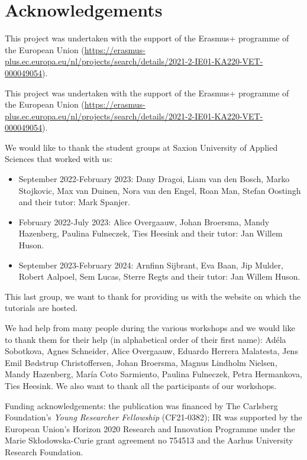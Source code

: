 \documentclass[
]{article}
\begin{document}
\hypertarget{acknowledgements}{%
\section{Acknowledgements}\label{acknowledgements}}

This project was undertaken with the support of the Erasmus+ programme of the European Union (\url{https://erasmus-plus.ec.europa.eu/nl/projects/search/details/2021-2-IE01-KA220-VET-000049054}).

This project was undertaken with the support of the Erasmus+ programme of the European Union (\url{https://erasmus-plus.ec.europa.eu/nl/projects/search/details/2021-2-IE01-KA220-VET-000049054}).

We would like to thank the student groups at Saxion University of Applied Sciences that worked with us:

\begin{itemize}
\item
  September 2022-February 2023: Dany Dragoi, Liam van den Bosch, Marko Stojkovic, Max van Duinen, Nora van den Engel, Roan Man, Stefan Oostingh and their tutor: Mark Spanjer.
\item
  February 2022-July 2023: Alice Overgaauw, Johan Broersma, Mandy Hazenberg, Paulina Fulneczek, Ties Heesink and their tutor: Jan Willem Huson.
\item
  September 2023-February 2024: Arnfinn Sijbrant, Eva Baan, Jip Mulder, Robert Aalpoel, Sem Lucas, Sterre Regts and their tutor: Jan Willem Huson.
\end{itemize}

This last group, we want to thank for providing us with the website on which the tutorials are hosted.

We had help from many people during the various workshops and we would like to thank them for their help (in alphabetical order of their first name): Adéla Sobotkova, Agnes Schneider, Alice Overgaauw, Eduardo Herrera Malatesta, Jens Emil Bødstrup Christoffersen, Johan Broersma, Magnus Lindholm Nielsen, Mandy Hazenberg, María Coto Sarmiento, Paulina Fulneczek, Petra Hermankova, Ties Heesink. We also want to thank all the participants of our workshops.

Funding acknowledgements: the publication was financed by The Carlsberg Foundation's \emph{Young Researcher Fellowship} (CF21-0382); IR was supported by the European Union's Horizon 2020 Research and Innovation Programme under the Marie Skłodowska-Curie grant agreement no 754513 and the Aarhus University Research Foundation.
\end{document}
